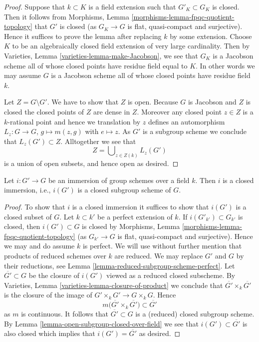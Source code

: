 \begin{proof}
Suppose that $k \subset K$ is a field extension such that
$G'_K \subset G_K$ is closed. Then it follows from
Morphisms, Lemma \ref{morphisms-lemma-fpqc-quotient-topology}
that $G'$ is closed (as $G_K \to G$ is flat, quasi-compact and surjective).
Hence it suffices to prove the lemma after replacing $k$ by some
extension. Choose $K$ to be an algebraically closed field extension of
very large cardinality. Then by
Varieties, Lemma \ref{varieties-lemma-make-Jacobson},
we see that $G_K$ is a Jacobson scheme all of whose closed points have residue
field equal to $K$. In other words we may assume $G$ is a Jacobson
scheme all of whose closed points have residue field $k$.

\medskip\noindent
Let $Z = G \setminus G'$. We have to show that $Z$ is open.
Because $G$ is Jacobson and $Z$ is closed
the closed points of $Z$ are dense in $Z$.
Moreover any closed point $z \in Z$ is a $k$-rational point and hence
we translation by $z$ defines an automorphism $L_z : G \to G$,
$g \mapsto m(z, g)$ with $e \mapsto z$. As $G'$ is a subgroup scheme we
conclude that $L_z(G') \subset Z$. Alltogether we see that
$$
Z = \bigcup\nolimits_{z \in Z(k)} L_z(G')
$$
is a union of open subsets, and hence open as desired.
\end{proof}

\begin{lemma}
\label{lemma-immersion-group-schemes-closed-over-field}
Let $i : G' \to G$ be an immersion of group schemes over a field $k$.
Then $i$ is a closed immersion, i.e., $i(G')$ is a closed subgroup scheme
of $G$.
\end{lemma}

\begin{proof}
To show that $i$ is a closed immersion it suffices to show that
$i(G')$ is a closed subset of $G$. Let $k \subset k'$ be a perfect
extension of $k$. If $i(G'_{k'}) \subset G_{k'}$ is closed, then
$i(G') \subset G$ is closed by
Morphisms, Lemma \ref{morphisms-lemma-fpqc-quotient-topology}
(as $G_{k'} \to G$ is flat, quasi-compact and surjective).
Hence we may and do assume $k$ is perfect. We will use without further
mention that products of reduced schemes over $k$ are reduced.
We may replace $G'$ and $G$ by their reductions, see
Lemma \ref{lemma-reduced-subgroup-scheme-perfect}.
Let $\overline{G'} \subset G$ be the closure of $i(G')$ viewed
as a reduced closed subscheme. By
Varieties, Lemma \ref{varieties-lemma-closure-of-product}
we conclude that $\overline{G'} \times_k \overline{G'}$
is the closure of the image of $G' \times_k G' \to G \times_k G$. Hence
$$
m\Big(\overline{G'} \times_k \overline{G'}\Big)
\subset \overline{G'}
$$
as $m$ is continuous. It follows that $\overline{G'} \subset G$
is a (reduced) closed subgroup scheme. By
Lemma \ref{lemma-open-subgroup-closed-over-field}
we see that $i(G') \subset \overline{G'}$ is also closed
which implies that $i(G') = \overline{G'}$ as desired.
\end{proof}

